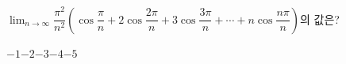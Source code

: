 \hspace*{2mm}\begin{minipage}[t]{\dimexpr\linewidth-2mm\relax}\vspace{0pt}
$\displaystyle\lim_{n\to\infty}\dfrac{\pi^2}{n^2}\left(\cos\dfrac{\pi}{n}+2\cos\dfrac{2\pi}{n}+3\cos\dfrac{3\pi}{n}+\cdots+n\cos\dfrac{n\pi}{n}\right)$의 값은?
\begin{choices32}{$-1$}{$-2$}{$-3$}{$-4$}{$-5$}\end{choices32}\end{minipage}
